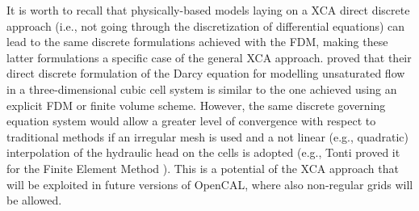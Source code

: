     It is worth to recall that physically-based models laying on a XCA
    direct discrete approach (i.e., not going through the
    discretization of differential equations) can lead to the same
    discrete formulations achieved with the FDM, making these latter
    formulations a specific case of the general XCA
    approach. \cite{Mendicino:2006} proved that
    their direct discrete formulation of the Darcy equation for
    modelling unsaturated flow in a three-dimensional cubic cell
    system is similar to the one achieved using an explicit FDM or
    finite volume scheme. However, the same discrete governing
    equation system would allow a greater level of convergence with
    respect to traditional methods if an irregular mesh is used
    and a not linear (e.g., quadratic) interpolation of the hydraulic
    head on the cells is adopted (e.g., Tonti proved it for the Finite
    Element Method \cite{Tonti2001237}). This is a potential of the XCA
    approach that will be exploited in future versions of OpenCAL,
    where also non-regular grids will be allowed.






